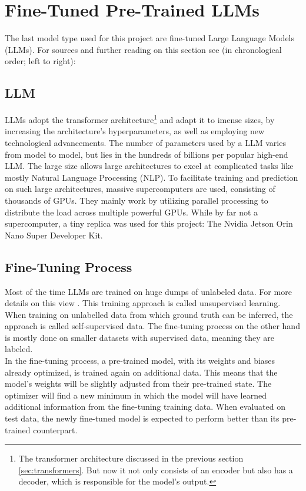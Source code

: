 \documentclass{article}
\begin{document}
\section{Fine-Tuned Pre-Trained LLMs}
The last model type used for this project are fine-tuned Large Language Models (LLMs).
For sources and further reading on this section see (in chronological order; left to right): \cite{geeksforgeeks_2024,Stryker_LLM,srinivasan2024transformer,Bergmann_Fine_Tuning}

\subsection{LLM}
LLMs adopt the transformer architecture\footnote{The transformer architecture discussed in the previous section \ref{sec:transformers}. But now it not only consists of an encoder but also has a decoder, which is responsible for the model's output.} and adapt it to imense sizes, by increasing the architecture's hyperparameters, as well as employing new technological advancements. The number of parameters used by a LLM varies from model to model, but lies in the hundreds of billions per popular high-end LLM.
The large size allows large architectures to excel at complicated tasks like mostly Natural Language Processing (NLP).
To facilitate training and prediction on such large architectures, massive supercomputers are used, consisting of thousands of GPUs. They mainly work by utilizing parallel processing to distribute the load across multiple powerful GPUs. While by far not a supercomputer, a tiny replica was used for this project: The Nvidia Jetson Orin Nano Super Developer Kit.

\subsection{Fine-Tuning Process}
Most of the time LLMs are trained on huge dumps of unlabeled data. For more details on this view \cite{kili2023}. 
This training approach is called unsupervised learning. When training on unlabelled data from which ground truth can be inferred, the approach is called self-supervised data. 
The fine-tuning process on the other hand is mostly done on smaller datasets with supervised data, meaning they are labeled.
\\[2em]
In the fine-tuning process, a pre-trained model, with its weights and biases already optimized, is trained again on additional data. This means that the model's weights will be slightly adjusted from their pre-trained state. The optimizer will find a new minimum in which the model will have learned additional information from the fine-tuning training data. When evaluated on test data, the newly fine-tuned model is expected to perform better than its pre-trained counterpart.
\end{document}
